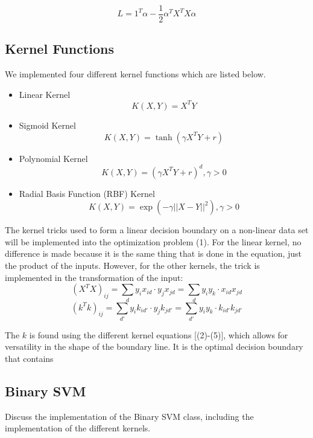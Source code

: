 \documentclass[12pt]{article}
\begin{document}
\begin{equation}
    L = 1^T \alpha - \frac{1}{2}\alpha^TX^TX\alpha
\end{equation}

\subsection{Kernel Functions}
We implemented four different kernel functions which are listed below.
\begin{itemize}
    \item Linear Kernel
    \begin{equation}
    K(X, Y) = X^T Y
    \end{equation}
    
    \item Sigmoid Kernel
    \begin{equation}
    K(X, Y) = \tanh(\gamma X^T Y + r)
    \end{equation}
    
    \item Polynomial Kernel
    \begin{equation}
    K(X, Y) = (\gamma X^T Y + r)^d, \gamma > 0
    \end{equation}
    
    \item Radial Basis Function (RBF) Kernel
    \begin{equation}
    K(X, Y) = \exp(-\gamma ||X - Y||^2), \gamma > 0
    \end{equation}
\end{itemize}

The kernel tricks used to form a linear decision boundary on a non-linear data set will be implemented into the optimization problem (1). For the linear kernel, no difference is made because it is the same thing that is done in the equation, just the product of the inputs. However, for the other kernels, the trick is implemented in the transformation of the input:
$$(X^TX)_{ij} = \sum_{d} y_i x_{id} \cdot y_j x_{jd} = \sum_{d} y_i y_k \cdot x_{id} x_{jd}$$
$$(k^Tk)_{ij} = \sum_{d'} y_i k_{id'} \cdot y_j k_{jd'} = \sum_{d'} y_i y_k \cdot k_{id'} k_{jd'}$$

The $k$ is found using the different kernel equations [(2)-(5)], which allows for versatility in the shape of the boundary line. It is the optimal decision boundary that contains 

\subsection{Binary SVM}
Discuss the implementation of the Binary SVM class, including the implementation of the different kernels.
\end{document}

